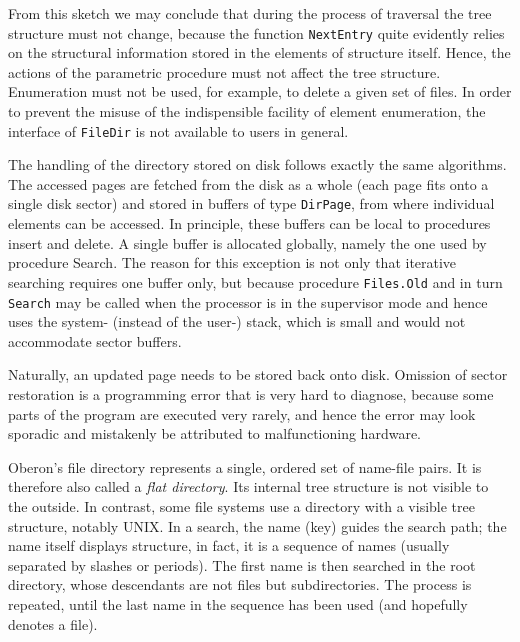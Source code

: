 From this sketch we may conclude that during the process of traversal the tree structure must not
change, because the function \verb|NextEntry| quite evidently relies on the structural information
stored in the elements of structure itself. Hence, the actions of the parametric procedure must not
affect the tree structure. Enumeration must not be used, for example, to delete a given set of files.
In order to prevent the misuse of the indispensible facility of element enumeration, the interface of
\verb|FileDir| is not available to users in general.

The handling of the directory stored on disk follows exactly the same algorithms. The accessed
pages are fetched from the disk as a whole (each page fits onto a single disk sector) and stored
in buffers of type \verb|DirPage|, from where individual elements can be accessed. In principle, these
buffers can be local to procedures insert and delete. A single buffer is allocated globally, namely
the one used by procedure Search. The reason for this exception is not only that iterative
searching requires one buffer only, but because procedure \verb|Files.Old| and in turn \verb|Search|
may be called when the processor is in the supervisor mode and hence uses the system- (instead of the
user-) stack, which is small and would not accommodate sector buffers.

Naturally, an updated page needs to be stored back onto disk. Omission of sector restoration is a
programming error that is very hard to diagnose, because some parts of the program are executed very
rarely, and hence the error may look sporadic and mistakenly be attributed to malfunctioning hardware.

Oberon's file directory represents a single, ordered set of name-file pairs. It is therefore also
called a \emph{flat directory}. Its internal tree structure is not visible to the outside. In contrast,
some file systems use a directory with a visible tree structure, notably UNIX. In a search, the name
(key) guides the search path; the name itself displays structure, in fact, it is a sequence of names
(usually separated by slashes or periods). The first name is then searched in the root directory,
whose descendants are not files but subdirectories. The process is repeated, until the last name
in the sequence has been used (and hopefully denotes a file).

